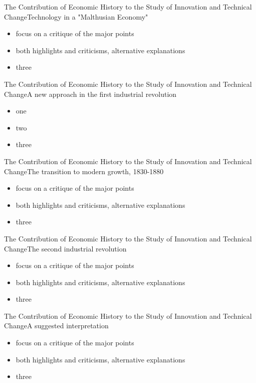 \documentclass{beamer}
\begin{document}
\begin{frame}{The Contribution of Economic History to the Study of Innovation and Technical Change}{Technology in a "Malthusian Economy"}
\begin{itemize}
\item<1->{focus on a critique of the major points}
\item<2->{both highlights and criticisms, alternative explanations}
\item<3->{three}
\end{itemize}
\end{frame}

\begin{frame}{The Contribution of Economic History to the Study of Innovation and Technical Change}{A new approach in the first industrial revolution}
\begin{itemize}
\item<1->{one}
\item<2->{two}
\item<3->{three}
\end{itemize}
\end{frame}

\begin{frame}{The Contribution of Economic History to the Study of Innovation and Technical Change}{The transition to modern growth, 1830-1880}
\begin{itemize}
\item<1->{focus on a critique of the major points}
\item<2->{both highlights and criticisms, alternative explanations}
\item<3->{three}
\end{itemize}
\end{frame}

\begin{frame}{The Contribution of Economic History to the Study of Innovation and Technical Change}{The second industrial revolution}
\begin{itemize}
\item<1->{focus on a critique of the major points}
\item<2->{both highlights and criticisms, alternative explanations}
\item<3->{three}
\end{itemize}
\end{frame}

\begin{frame}{The Contribution of Economic History to the Study of Innovation and Technical Change}{A suggested interpretation}
\begin{itemize}
\item<1->{focus on a critique of the major points}
\item<2->{both highlights and criticisms, alternative explanations}
\item<3->{three}
\end{itemize}
\end{frame}
\end{document}
